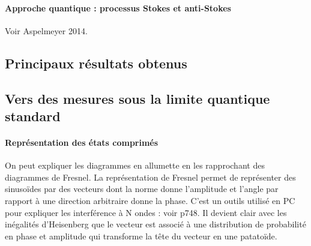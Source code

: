 \documentclass[12pt,a4paper]{article}
\begin{document}
\paragraph{Approche quantique : processus Stokes et anti-Stokes\\}
Voir Aspelmeyer 2014.


\subsection{Principaux résultats obtenus}
\label{sec:results}

\subsection{Vers des mesures sous la limite quantique standard}
\label{sec:prospects}

\paragraph{Représentation des états comprimés\\}
On peut expliquer les diagrammes en allumette en les rapprochant des diagrammes de Fresnel.
La représentation de Fresnel permet de représenter des sinusoïdes par des vecteurs dont la norme donne l'amplitude et l'angle par rapport à une direction arbitraire donne la phase.
C'est un outils utilisé en PC pour expliquer les interférence à N ondes : voir \cite{Sanz2016} p748.
Il devient clair avec les inégalités d'Heisenberg que le vecteur est associé à une distribution de probabilité en phase et amplitude qui transforme la tête du vecteur en une patatoïde.
\end{document}
